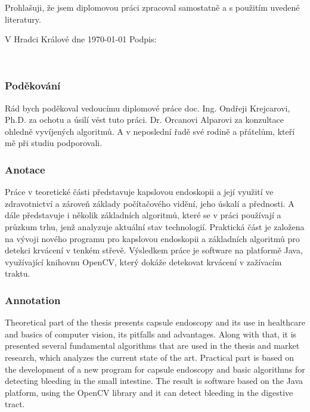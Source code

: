 \noindent Prohlašuji, že jsem diplomovou práci zpracoval samostatně a s použitím uvedené literatury.

\bigskip{}
\noindent V Hradci Králové dne \today\hspace{10em} Podpis:

\clearpage{}

\newpage{}\thispagestyle{plain}

{\small %
	\ }{\small \par}

\noindent {\small \vfill{}
	~}{\small \par}

\subsubsection*{Poděkování}

\noindent Rád bych poděkoval vedoucímu diplomové práce doc. Ing. Ondřeji Krejcarovi, Ph.D. za ochotu a úsilí vést tuto práci. Dr. Orcanovi Alparovi za konzultace ohledně vyvíjených algoritmů. A v neposlední řadě své rodině a přátelům, kteří mě při studiu podporovali.

\clearpage{}

\newpage{}\thispagestyle{plain}

\subsubsection*{Anotace}

Práce v teoretické části představuje kapslovou endoskopii a její využití ve zdravotnictví a zároveň základy počítačového vidění, jeho úskalí a přednosti. A dále představuje i několik základních algoritmů, které se v práci používají a průzkum trhu, jenž analyzuje aktuální stav technologií. Praktická část je založena na vývoji nového programu pro kapslovou endoskopii a základních algoritmů pro detekci krvácení v tenkém střevě. Výsledkem práce je software na platformě Java, využívající knihovnu OpenCV, který dokáže detekovat krvácení v zažívacím traktu.

\subsubsection*{Annotation}

Theoretical part of the thesis presents capsule endoscopy and its use in healthcare and basics of computer vision, its pitfalls and advantages. Along with that, it is presented several fundamental algorithms that are used in the thesis and market research, which analyzes the current state of the art. Practical part is based on the development of a new program for capsule endoscopy and basic algorithms for detecting bleeding in the small intestine. The result is software based on the Java platform, using the OpenCV library and it can detect bleeding in the digestive tract.

\cleardoublepage{}

{\small %
}{\small \par}

\cleardoublepage{}\thispagestyle{empty}
\tableofcontents{}